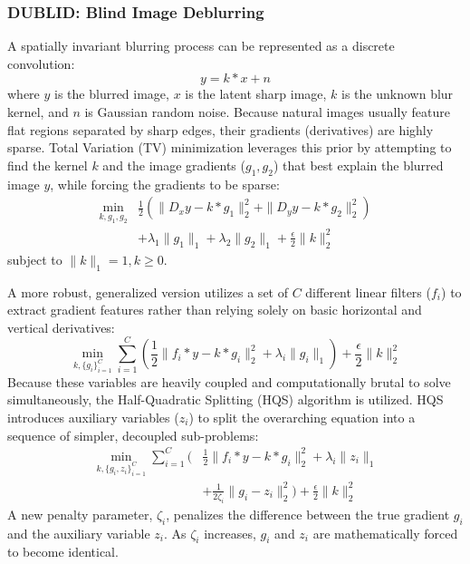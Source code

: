 \documentclass[conference]{IEEEtran}
\begin{document}
\subsubsection{DUBLID: Blind Image Deblurring}
A spatially invariant blurring process can be represented as a discrete convolution:
\begin{equation}
y = k * x + n
\end{equation}
where $y$ is the blurred image, $x$ is the latent sharp image, $k$ is the unknown blur kernel, and $n$ is Gaussian random noise. Because natural images usually feature flat regions separated by sharp edges, their gradients (derivatives) are highly sparse. Total Variation (TV) minimization leverages this prior by attempting to find the kernel $k$ and the image gradients ($g_1, g_2$) that best explain the blurred image $y$, while forcing the gradients to be sparse:
\begin{equation}
\begin{aligned}
\min_{k,g_1,g_2} &\frac{1}{2}(\|D_x y - k * g_1\|_2^2 + \|D_y y - k * g_2\|_2^2) \\
&+ \lambda_1\|g_1\|_1 + \lambda_2\|g_2\|_1 + \frac{\epsilon}{2}\|k\|_2^2
\end{aligned}
\end{equation}
subject to $\|k\|_1 = 1, k \ge 0$. 

A more robust, generalized version utilizes a set of $C$ different linear filters ($f_i$) to extract gradient features rather than relying solely on basic horizontal and vertical derivatives:
\begin{equation}
\min_{k,\{g_i\}_{i=1}^C} \sum_{i=1}^C \left( \frac{1}{2}\|f_i * y - k * g_i\|_2^2 + \lambda_i\|g_i\|_1 \right) + \frac{\epsilon}{2}\|k\|_2^2
\end{equation}
Because these variables are heavily coupled and computationally brutal to solve simultaneously, the Half-Quadratic Splitting (HQS) algorithm is utilized. HQS introduces auxiliary variables ($z_i$) to split the overarching equation into a sequence of simpler, decoupled sub-problems:
\begin{equation}
\begin{aligned}
\min_{k,\{g_i,z_i\}_{i=1}^C} \sum_{i=1}^C \bigg( &\frac{1}{2}\|f_i * y - k * g_i\|_2^2 + \lambda_i\|z_i\|_1 \\
&+ \frac{1}{2\zeta_i}\|g_i - z_i\|_2^2 \bigg) + \frac{\epsilon}{2}\|k\|_2^2
\end{aligned}
\end{equation}
A new penalty parameter, $\zeta_i$, penalizes the difference between the true gradient $g_i$ and the auxiliary variable $z_i$. As $\zeta_i$ increases, $g_i$ and $z_i$ are mathematically forced to become identical.
\end{document}
